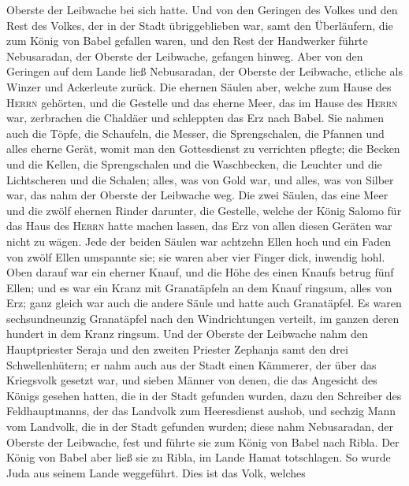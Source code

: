 Oberste der Leibwache bei sich hatte.  Und von den
Geringen des Volkes und den Rest des Volkes, der in der Stadt
übriggeblieben war, samt den Überläufern, die zum König von Babel
gefallen waren, und den Rest der Handwerker führte Nebusaradan, der
Oberste der Leibwache, gefangen hinweg.  Aber von den
Geringen auf dem Lande ließ Nebusaradan, der Oberste der Leibwache,
etliche als Winzer und Ackerleute zurück.  Die ehernen
Säulen aber, welche zum Hause des \textsc{Herrn} gehörten, und die
Gestelle und das eherne Meer, das im Hause des \textsc{Herrn} war,
zerbrachen die Chaldäer und schleppten das Erz nach Babel.
 Sie nahmen auch die Töpfe, die Schaufeln, die Messer,
die Sprengschalen, die Pfannen und alles eherne Gerät, womit man den
Gottesdienst zu verrichten pflegte;  die Becken und die
Kellen, die Sprengschalen und die Waschbecken, die Leuchter und die
Lichtscheren und die Schalen; alles, was von Gold war, und alles, was
von Silber war, das nahm der Oberste der Leibwache weg. 
Die zwei Säulen, das eine Meer und die zwölf ehernen Rinder darunter,
die Gestelle, welche der König Salomo für das Haus des \textsc{Herrn}
hatte machen lassen, das Erz von allen diesen Geräten war nicht zu
wägen.  Jede der beiden Säulen war achtzehn Ellen hoch
und ein Faden von zwölf Ellen umspannte sie; sie waren aber vier Finger
dick, inwendig hohl.  Oben darauf war ein eherner Knauf,
und die Höhe des einen Knaufs betrug fünf Ellen; und es war ein Kranz
mit Granatäpfeln an dem Knauf ringsum, alles von Erz; ganz gleich war
auch die andere Säule und hatte auch Granatäpfel.  Es
waren sechsundneunzig Granatäpfel nach den Windrichtungen verteilt, im
ganzen deren hundert in dem Kranz ringsum.  Und der
Oberste der Leibwache nahm den Hauptpriester Seraja und den zweiten
Priester Zephanja samt den drei Schwellenhütern;  er nahm
auch aus der Stadt einen Kämmerer, der über das Kriegsvolk gesetzt war,
und sieben Männer von denen, die das Angesicht des Königs gesehen
hatten, die in der Stadt gefunden wurden, dazu den Schreiber des
Feldhauptmanns, der das Landvolk zum Heeresdienst aushob, und sechzig
Mann vom Landvolk, die in der Stadt gefunden wurden; 
diese nahm Nebusaradan, der Oberste der Leibwache, fest und führte sie
zum König von Babel nach Ribla.  Der König von Babel aber
ließ sie zu Ribla, im Lande Hamat totschlagen. So wurde Juda aus seinem
Lande weggeführt.  Dies ist das Volk, welches
